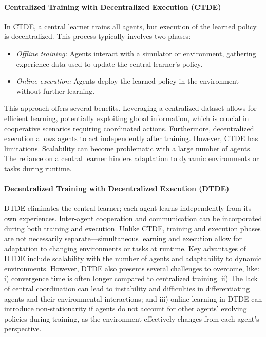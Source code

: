 \documentclass[sigconf]{acmart}
\begin{document}
\paragraph{Centralized Training with Decentralized Execution (CTDE)}
In CTDE, a central learner trains all agents, 
but execution of the learned policy is decentralized. 
This process typically involves two phases:
\begin{itemize}
  \item \textit{Offline training:} Agents interact with a simulator or environment, gathering experience data used to update the central learner's policy.
  \item \textit{Online execution:} Agents deploy the learned policy in the environment without further learning.
\end{itemize}
This approach offers several benefits.  
Leveraging a centralized dataset allows for efficient learning, 
potentially exploiting global information, 
which is crucial in cooperative scenarios requiring coordinated actions. 
Furthermore, decentralized execution allows agents to act independently after training.
%
However, CTDE has limitations. 
Scalability can become problematic with a large number of agents. 
The reliance on a central learner hinders adaptation to dynamic environments or tasks during runtime.
\sloppy
\paragraph{Decentralized Training with Decentralized Execution (DTDE)}
DTDE eliminates the central learner; each agent learns independently from its own experiences.
Inter-agent cooperation and communication can be incorporated during both training and execution. 
Unlike CTDE, training and execution phases are not necessarily separate---simultaneous learning and execution allow for adaptation to 
changing environments or tasks at runtime.
%
Key advantages of DTDE include scalability with the number of agents and adaptability to dynamic environments.
%
However, DTDE also presents several challenges to overcome, like: 
i) convergence time is often longer compared to centralized training. 
ii) The lack of central coordination can lead to instability and difficulties in differentiating agents and their environmental interactions; and 
iii) online learning in DTDE can introduce non-stationarity if agents do not account for other agents' evolving policies during training, 
as the environment effectively changes from each agent's perspective.
\end{document}
